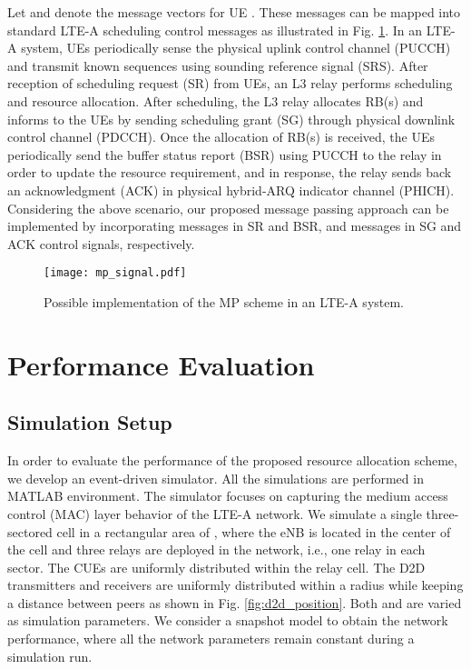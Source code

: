 \documentclass[twocolumn,10pt]{IEEEtran}
\begin{document}
Let  and  denote the  message vectors for UE . These messages can be mapped into standard LTE-A scheduling control messages as illustrated in Fig. \ref{fig:mp_signal}. In an LTE-A system, UEs periodically sense the physical uplink control channel (PUCCH) and transmit known sequences using sounding reference signal (SRS). After reception of scheduling request (SR) from UEs, an L3 relay performs scheduling and resource allocation. After scheduling, the L3 relay allocates RB(s) and informs to the UEs by sending scheduling grant (SG) through  physical downlink control channel (PDCCH). Once the allocation of RB(s) is received, the UEs periodically send the buffer status report (BSR) using PUCCH to the relay in order to update the resource requirement, and in response, the relay sends back an acknowledgment (ACK) in physical hybrid-ARQ indicator channel (PHICH). Considering the above scenario, our proposed message passing approach can be implemented by incorporating  messages in SR and BSR, and  messages in SG and ACK control signals, respectively.


\begin{figure}[!t]
\centering
\texttt{[image: mp\_signal.pdf]}
\caption{Possible implementation of the MP scheme in an LTE-A system.} 
\label{fig:mp_signal}
\end{figure}


\section{Performance Evaluation} \label{sec:performance}

\subsection{Simulation Setup}

In order to evaluate the performance of the proposed resource allocation scheme, we develop an event-driven simulator. All the simulations are performed in MATLAB environment. The simulator focuses on capturing the medium access control (MAC) layer behavior of the LTE-A network. We simulate a single three-sectored cell in a rectangular area of , where the eNB is located in the center of the cell and three relays are deployed in the network, i.e., one relay in each sector. The CUEs are uniformly distributed within the relay cell. The D2D transmitters and receivers are uniformly distributed within a radius  while keeping a distance  between peers as shown in Fig. \ref{fig:d2d_position}.  Both  and  are varied as  simulation parameters. We consider a snapshot model to obtain the network performance, where all the network parameters remain constant during a simulation run. 
\end{document}
